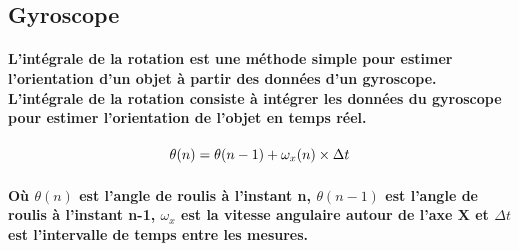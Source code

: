 \subsection{Gyroscope}

\paragraph{L'intégrale de la rotation est une méthode simple pour estimer l'orientation d'un objet à partir des données d'un gyroscope. L'intégrale de la rotation consiste à intégrer les données du gyroscope pour estimer l'orientation de l'objet en temps réel.}

\begin{equation}
	\theta(n) = \theta(n - 1) + \omega_x(n) \times \Delta t \\
\end{equation}

\paragraph{Où $\theta(n)$ est l'angle de roulis à l'instant n, $\theta(n - 1)$ est l'angle de roulis à l'instant n-1, $\omega_x$ est la vitesse angulaire autour de l'axe X et $\Delta t$ est l'intervalle de temps entre les mesures.}
